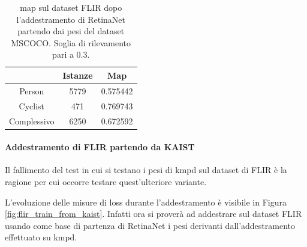 \begin{table}[]
    \centering
    \begin{tabular}{c|c|c|}
    \cline{2-3}
     & Istanze & Map \\ \hline
    \multicolumn{1}{|c|}{Person} & 5779 & 0.575442 \\ \hline
    \multicolumn{1}{|c|}{Cyclist} & 471 & 0.769743 \\ \hline
    \multicolumn{1}{|c|}{Complessivo} & 6250 & 0.672592 \\ \hline
    \end{tabular}
    \caption{\ac{map} sul dataset FLIR dopo l'addestramento di RetinaNet partendo dai pesi del dataset \ac{MSCOCO}. Soglia di rilevamento pari a $0.3$.}
    \label{table:coco_result_best_flir}
\end{table}


\paragraph{Addestramento di FLIR partendo da KAIST}
Il fallimento del test in cui si testano i pesi di \ac{kmpd} sul dataset di FLIR è la ragione per cui occorre testare quest'ulteriore variante.

L'evoluzione delle misure di loss durante l'addestramento è visibile in Figura \ref{fig:flir_train_from_kaist}. Infatti ora si proverà ad addestrare sul dataset FLIR usando come base di partenza di RetinaNet i pesi derivanti dall'addestramento effettuato su \ac{kmpd}.

